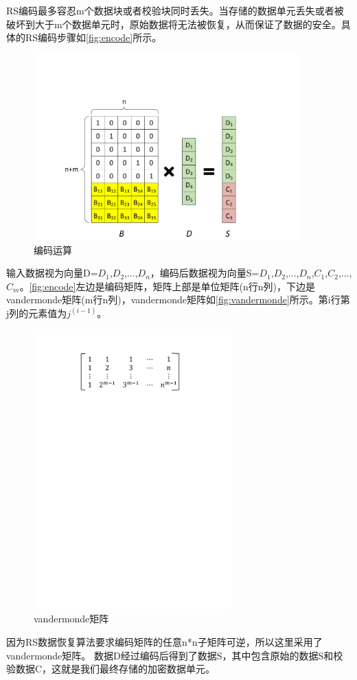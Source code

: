 RS编码最多容忍m个数据块或者校验块同时丢失。当存储的数据单元丢失或者被破坏到大于m个数据单元时，原始数据将无法被恢复，从而保证了数据的安全。具体的RS编码步骤如\autoref{fig:encode}所示。
\begin{figure}[H]
	\centering
	\includegraphics[width=4in]{Pics/encode.pdf}
	\caption{编码运算}\label{fig:encode}
\end{figure}
输入数据视为向量D={$D_1$,$D_2$,...,$D_n$}，编码后数据视为向量S={$D_1$,$D_2$,...,$D_n$,$C_1$,$C_2$,...,$C_m$}。\autoref{fig:encode}左边是编码矩阵，矩阵上部是单位矩阵(n行n列)，下边是vandermonde矩阵(m行n列)，vandermonde矩阵如\autoref{fig:vandermonde}所示。第i行第j列的元素值为$j^{(i-1)}$。
\begin{figure}[H]
	\centering
	\includegraphics[width=3in]{Pics/vandermonde.pdf}
	\caption{vandermonde矩阵}\label{fig:vandermonde}
\end{figure}
因为RS数据恢复算法要求编码矩阵的任意n*n子矩阵可逆，所以这里采用了vandermonde矩阵。
数据D经过编码后得到了数据S，其中包含原始的数据S和校验数据C，这就是我们最终存储的加密数据单元。


